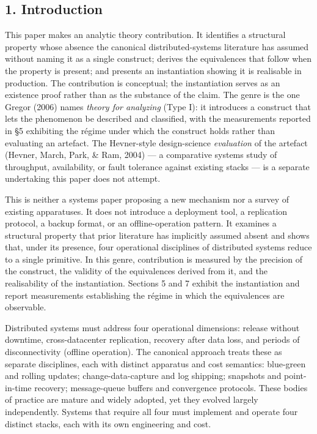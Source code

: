 \documentclass[
]{article}
\begin{document}
\subsection{1. Introduction}\label{introduction}

This paper makes an analytic theory contribution. It identifies a
structural property whose absence the canonical distributed-systems
literature has assumed without naming it as a single construct; derives
the equivalences that follow when the property is present; and presents
an instantiation showing it is realisable in production. The
contribution is conceptual; the instantiation serves as an existence
proof rather than as the substance of the claim. The genre is the one
Gregor (2006) names \emph{theory for analyzing} (Type I): it introduces
a construct that lets the phenomenon be described and classified, with
the measurements reported in §5 exhibiting the régime under which the
construct holds rather than evaluating an artefact. The Hevner-style
design-science \emph{evaluation} of the artefact (Hevner, March, Park,
\& Ram, 2004) --- a comparative systems study of throughput,
availability, or fault tolerance against existing stacks --- is a
separate undertaking this paper does not attempt.

This is neither a systems paper proposing a new mechanism nor a survey
of existing apparatuses. It does not introduce a deployment tool, a
replication protocol, a backup format, or an offline-operation pattern.
It examines a structural property that prior literature has implicitly
assumed absent and shows that, under its presence, four operational
disciplines of distributed systems reduce to a single primitive. In this
genre, contribution is measured by the precision of the construct, the
validity of the equivalences derived from it, and the realisability of
the instantiation. Sections 5 and 7 exhibit the instantiation and report
measurements establishing the régime in which the equivalences are
observable.

Distributed systems must address four operational dimensions: release
without downtime, cross-datacenter replication, recovery after data
loss, and periods of disconnectivity (offline operation). The canonical
approach treats these as separate disciplines, each with distinct
apparatus and cost semantics: blue-green and rolling updates;
change-data-capture and log shipping; snapshots and point-in-time
recovery; message-queue buffers and convergence protocols. These bodies
of practice are mature and widely adopted, yet they evolved largely
independently. Systems that require all four must implement and operate
four distinct stacks, each with its own engineering and cost.
\end{document}
